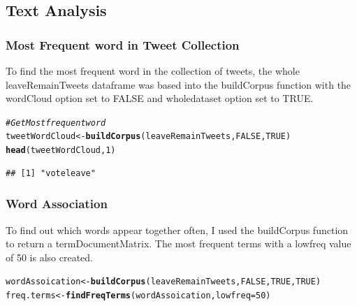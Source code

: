\documentclass[10pt  ,usenames, dvipsnames]{article}\usepackage[]{graphicx}\usepackage[]{color}
\makeatletter
\newcommand{\hlnum}[1]{\textcolor[rgb]{0.686,0.059,0.569}{#1}}%
\newcommand{\hlcom}[1]{\textcolor[rgb]{0.678,0.584,0.686}{\textit{#1}}}%
\newcommand{\hlstd}[1]{\textcolor[rgb]{0.345,0.345,0.345}{#1}}%
\newcommand{\hlkwb}[1]{\textcolor[rgb]{0.69,0.353,0.396}{#1}}%
\newcommand{\hlkwc}[1]{\textcolor[rgb]{0.333,0.667,0.333}{#1}}%
\newcommand{\hlkwd}[1]{\textcolor[rgb]{0.737,0.353,0.396}{\textbf{#1}}}%
\newenvironment{kframe}{%
 \def\at@end@of@kframe{}%
 \ifinner\ifhmode%
  \def\at@end@of@kframe{\end{minipage}}%
  \begin{minipage}{\columnwidth}%
 \fi\fi%
 \def\FrameCommand##1{\hskip\@totalleftmargin \hskip-\fboxsep
 \colorbox{shadecolor}{##1}\hskip-\fboxsep
     \hskip-\linewidth \hskip-\@totalleftmargin \hskip\columnwidth}%
 \MakeFramed {\advance\hsize-\width
   \@totalleftmargin\z@ \linewidth\hsize
   \@setminipage}}%
 {\par\unskip\endMakeFramed%
 \at@end@of@kframe}
\newenvironment{knitrout}{}{} %
\makeatother
\begin{document}
\clearpage


\subsection{Text Analysis}

\subsubsection{Most Frequent word in Tweet Collection}

To find the most frequent word in the collection of tweets, the whole leaveRemainTweets dataframe was based into the buildCorpus function with the wordCloud option set to FALSE and wholedataset option set to TRUE.

\begin{knitrout}
\color{fgcolor}\begin{kframe}
\begin{alltt}
\hlcom{#Get Most frequent word}
\hlstd{tweetWordCloud} \hlkwb{<-}\hlkwd{buildCorpus}\hlstd{(leaveRemainTweets,} \hlnum{FALSE}\hlstd{,} \hlnum{TRUE}\hlstd{)}
\hlkwd{head}\hlstd{(tweetWordCloud,}\hlnum{1}\hlstd{)}
\end{alltt}
\end{kframe}
\end{knitrout}


\begin{knitrout}
\color{fgcolor}\begin{kframe}
\begin{verbatim}
## [1] "voteleave"
\end{verbatim}
\end{kframe}
\end{knitrout}


\subsubsection{Word Association}


To find out which words appear together often, I used the buildCorpus function to return a termDocumentMatrix. The most frequent terms with a lowfreq value of 50 is also created.

\begin{knitrout}
\color{fgcolor}\begin{kframe}
\begin{alltt}
\hlstd{wordAssoication} \hlkwb{<-} \hlkwd{buildCorpus}\hlstd{(leaveRemainTweets,}\hlnum{FALSE}\hlstd{,}\hlnum{TRUE}\hlstd{,}\hlnum{TRUE}\hlstd{)}
\hlstd{freq.terms} \hlkwb{<-} \hlkwd{findFreqTerms}\hlstd{(wordAssoication,} \hlkwc{lowfreq} \hlstd{=}\hlnum{50}\hlstd{)}
\end{alltt}
\end{kframe}
\end{knitrout}
\end{document}
